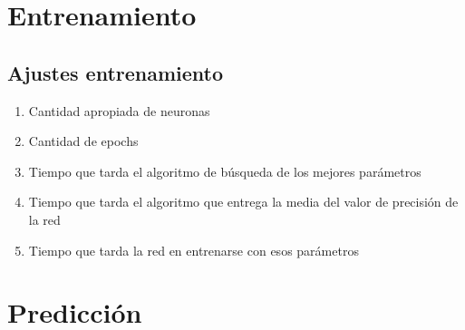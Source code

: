 \section{Entrenamiento}
\subsection{Ajustes entrenamiento}

\begin{enumerate}
    \item{Cantidad apropiada de neuronas}
    \item{Cantidad de epochs}
    \item{Tiempo que tarda el algoritmo de búsqueda de los mejores parámetros}
    \item{Tiempo que tarda el algoritmo que entrega la media del valor de precisión  de la red}
    \item{Tiempo que tarda la red en entrenarse con esos parámetros}
\end{enumerate}

\section{Predicción}

